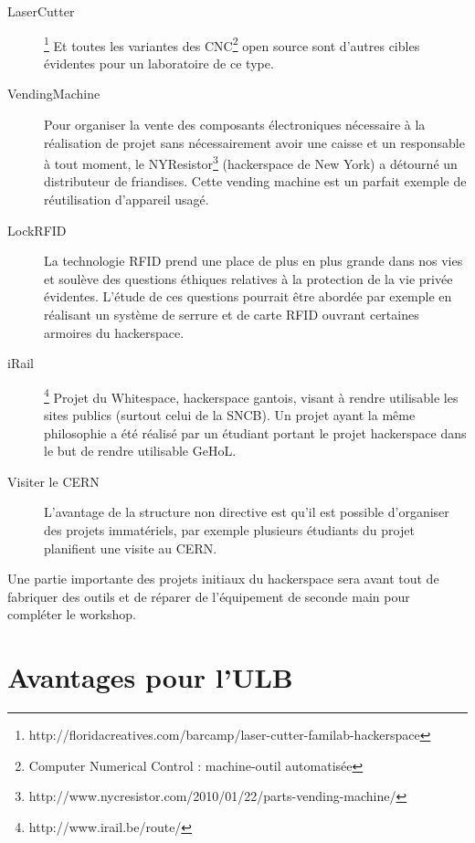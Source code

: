 \documentclass{article}
\begin{document}
\begin{description}
\item[LaserCutter]\footnote{http://floridacreatives.com/barcamp/laser-cutter-familab-hackerspace} Et toutes les variantes des CNC\footnote{Computer Numerical Control : machine-outil automatisée} open source sont d'autres cibles évidentes pour un laboratoire de ce type.
\item[VendingMachine] Pour organiser la vente des composants électroniques nécessaire à la réalisation de projet sans nécessairement avoir une caisse et un responsable à tout moment, le NYResistor\footnote{http://www.nycresistor.com/2010/01/22/parts-vending-machine/} (hackerspace de New York) a détourné un distributeur de friandises. Cette vending machine est un parfait exemple de réutilisation d'appareil usagé.
\item[LockRFID] La technologie RFID prend une place de plus en plus grande dans nos vies et soulève des questions éthiques relatives à la protection de la vie privée évidentes. L'étude de ces questions pourrait être abordée par exemple en réalisant un système de serrure et de carte RFID ouvrant certaines armoires du hackerspace.
\item[iRail]\footnote{http://www.irail.be/route/} Projet du Whitespace, hackerspace gantois, visant à rendre utilisable les sites publics (surtout celui de la SNCB). Un projet ayant la même philosophie a été réalisé par un étudiant portant le projet hackerspace dans le but de rendre utilisable GeHoL.
\item[Visiter le CERN] L'avantage de la structure non directive est qu'il est possible d'organiser des projets immatériels, par exemple plusieurs étudiants du projet planifient une visite au CERN.
\end{description}

Une partie importante des projets initiaux du hackerspace sera avant tout de fabriquer des outils et de réparer de l'équipement de seconde main pour compléter le workshop.

\section{Avantages pour l'ULB}
\end{document}
